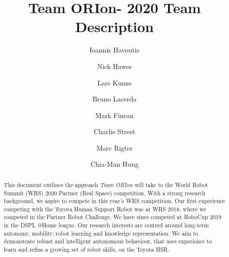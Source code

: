 \documentclass[runningheads,a4paper]{llncs}
\newcommand{\teamori}{Team ORIon}
\begin{document}

\title{\teamori - 2020 Team Description}

\author{Ioannis Havoutis \and Nick Hawes \and Lars Kunze \and Bruno Lacerda 
\and Mark Finean \and Charlie Street \and Marc Rigter \and Chia-Man Hung}

\maketitle


\begin{abstract}
This document outlines the approach \textit{\teamori} will take to the 
World Robot Summit (WRS) 2020 Partner (Real Space) competition. 
With a strong research background, we aspire to compete 
in this year's WRS competition. Our first experience competing with the Toyota Human 
Support Robot was at WRS 2018, where we competed in the Partner 
Robot Challenge. We have since competed at RoboCup 2019 in the DSPL @Home league.
Our research interests are centred around long-term
autonomy, mobility, robot learning and knowledge representation. We aim to demonstrate robust and intelligent autonomous behaviour, that uses
experience to learn and refine a growing set of robot skills, on the Toyota
HSR.
\end{abstract}


\end{document}
